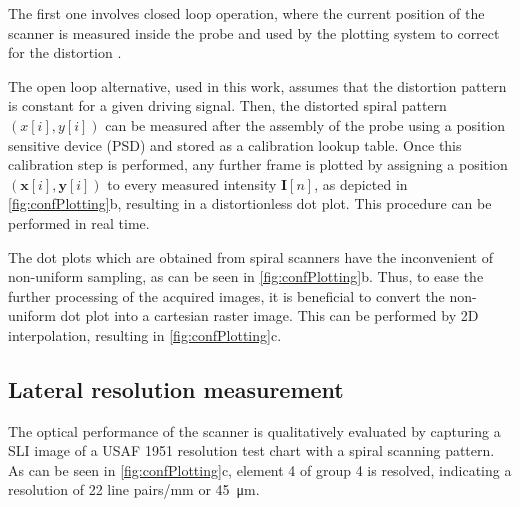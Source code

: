 \documentclass[10pt]{iopart}
\begin{document}
The first one involves closed loop operation, where the current position of the scanner is measured inside the probe and used by the plotting system to correct for the distortion \cite{Yeoh2014}. 

The open loop alternative, used in this work, assumes that the distortion pattern is constant for a given driving signal. Then, the distorted spiral pattern $(x[i], y[i])$ can be measured after the assembly of the probe using a position sensitive device (PSD) and stored as a calibration lookup table.
Once this calibration step is performed, any further frame is plotted by assigning a position $(\mathbf{x}[i], \mathbf{y}[i])$ to every measured intensity $\mathbf{I}[n]$, as depicted in \autoref{fig:confPlotting}b, resulting in a distortionless dot plot. This procedure can be performed in real time.

The dot plots which are obtained from spiral scanners have the inconvenient of non-uniform sampling, as can be seen in \autoref{fig:confPlotting}b. Thus, to ease the further processing of the acquired images, it is beneficial to convert the non-uniform dot plot into a cartesian raster image. This can be performed by 2D interpolation, resulting in \autoref{fig:confPlotting}c.


\subsection{Lateral resolution measurement}
The optical performance of the scanner is qualitatively evaluated by capturing a SLI image of a USAF 1951 resolution test chart with a spiral scanning pattern. As can be seen in \autoref{fig:confPlotting}c, element 4 of group 4 is resolved, indicating a resolution of 22 line pairs/mm or \SI{45}{\micro\meter}. 
\end{document}
